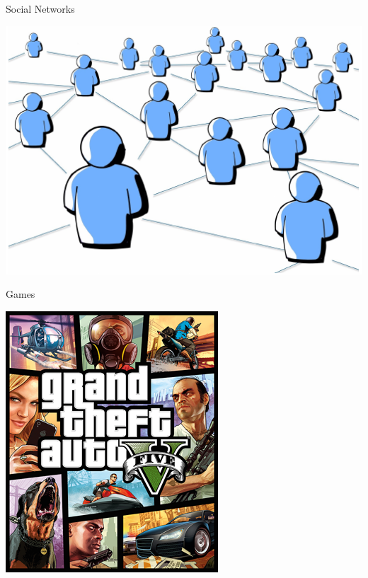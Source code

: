 \documentclass{beamer}
\begin{document}
\begin{frame}{Social Networks}

\begin{center}
\includegraphics[width=.8\textwidth]{figs/SocialNetworks}
\end{center}

\end{frame}

\begin{frame}{Games}

\begin{center}
\includegraphics[width=.45\textwidth,keepaspectratio=true]{figs/games}
\end{center}

\end{frame}
\end{document}
